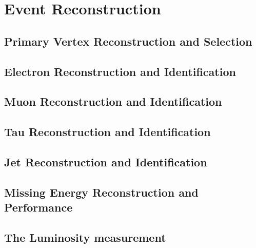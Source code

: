 \chapter{Event Reconstruction}

\section{Primary Vertex Reconstruction and Selection}

\section{Electron Reconstruction and Identification}

\section{Muon Reconstruction and Identification}

\section{Tau Reconstruction and Identification}

\section{Jet Reconstruction and Identification}

\section{Missing Energy Reconstruction and Performance}
    
\section{The Luminosity measurement }

